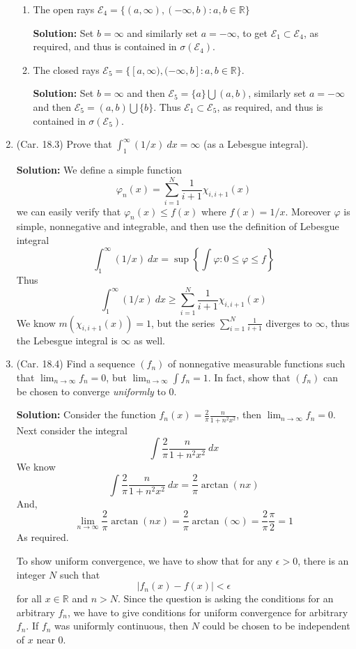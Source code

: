 \documentclass{article}
\def\ge{\geqslant}
\def\le{\leqslant}
\def\phi{\varphi}
\def\to{\rightarrow}
\def\RR{\mathbb R}
\begin{document}
\begin{enumerate}
\begin{enumerate}
  \item The open rays $\mathcal{E}_4=\{(a,\infty),(-\infty,b): a,b\in \RR\}$

    \textbf{Solution:} Set $b=\infty$ and similarly set $a=-\infty$, to get
$\mathcal{E}_1 \subset \mathcal{E}_4$, as required, and thus
is contained in $\sigma(\mathcal{E}_4)$.
  \item The closed rays $\mathcal{E}_5=\{[a,\infty),(-\infty,b]: a,b\in \RR\}$.

    \textbf{Solution:}     
Set $b=\infty$ and then $\mathcal{E}_5 = \{a\}\bigcup (a,b)$, similarly
set $a=-\infty$ and then $\mathcal{E}_5 = (a,b)\bigcup \{b\}$. Thus
$\mathcal{E}_1 \subset \mathcal{E}_5$, as required, and thus
is contained in $\sigma(\mathcal{E}_5)$.
  \end{enumerate}


\item (Car. 18.3) Prove that $\int_1^\infty (1/x)\ dx = \infty$ (as a Lebesgue integral).

\textbf{Solution:} We define a simple function
\[
\phi_n (x) = \sum_{i=1}^N \frac{1}{i+1} \chi_{i,i+1} (x)
\]
we can easily verify that $\phi_n(x) \le f(x)$ where $f(x)=1/x$.
Moreover $\phi$ is simple, nonnegative and integrable, 
and then use the definition of Lebesgue integral
\[
\int_1^\infty (1/x)\ dx = \sup \left\{ \int \phi : 0 \le \phi \le f \right\}
\]
Thus
\[
\int_1^\infty (1/x)\ dx \ge \sum_{i=1}^N \frac{1}{i+1} \chi_{i,i+1} (x)
\]
We know $m(\chi_{i,i+1}(x))=1$, but the series $\sum_{i=1}^N \frac{1}{i+1}$
diverges to $\infty$, thus the Lebesgue integral is $\infty$ as well.

\item (Car. 18.4) Find a sequence $(f_n)$ of nonnegative measurable functions such that
  $\lim_{n\to\infty} f_n=0$, but $\lim_{n\to\infty}\int f_n=1$. In fact, show that $(f_n)$ can be
  chosen to converge \emph{uniformly} to 0.

\textbf{Solution:} Consider the function $f_n(x)=\frac{2}{\pi}\frac{n}{1+n^2x^2}$, then
$\lim_{n\to\infty} f_n=0$. Next consider the integral
\[
 \int  \frac{2}{\pi}\frac{n}{1+n^2x^2} \ dx
\]
We know
\[
 \int  \frac{2}{\pi}\frac{n}{1+n^2x^2} \ dx = \frac{2}{\pi}\arctan(nx)
\]
And,
\[
\lim_{n\to\infty} \frac{2}{\pi}\arctan(nx) = \frac{2}{\pi}\arctan({\infty}) = 
\frac{2}{\pi}\frac{\pi}{2}=1
\]
As required. 

To show uniform convergence, we have to show that 
for any $\epsilon>0$, there is an integer $N$
such that 
\[
|f_n(x) - f(x)| < \epsilon
\] for all $x\in\RR$ and $n>N$. Since the question is asking the conditions
for an arbitrary $f_n$, we have to give conditions for uniform
convergence for arbitrary $f_n$. If $f_n$ was uniformly continuous, then
$N$ could be chosen to be independent of $x$ near 0.



\end{enumerate}
\end{document}
